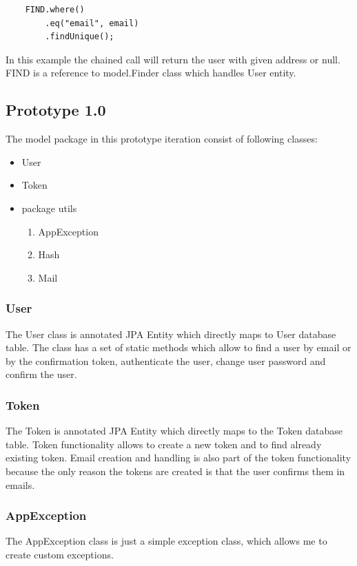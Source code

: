 \documentclass[12pt,twoside,a4paper]{report}
\begin{document}
\begin{lstlisting}
	FIND.where()
		.eq("email", email)
		.findUnique();
\end{lstlisting}

In this example the chained call will return the user with given address or null. FIND is a reference to model.Finder class which handles User entity.

\subsection{Prototype 1.0}\label{4.4.1}
The model package in this prototype iteration consist of following classes:
\begin{itemize}\itemsep1pt \parskip0pt 
	\item User
	\item Token
	\item package utils
	\begin{enumerate}
	\item AppException
	\item Hash
	\item Mail
	\end{enumerate}
\end{itemize}

\subsubsection{User}
The User class is annotated JPA Entity which directly maps to User database table. The class has a set of static methods which allow to find a user by email or by the confirmation token, authenticate the user, change user password and confirm the user.

\subsubsection{Token}
The Token is annotated JPA Entity which directly maps to the Token database table. Token functionality allows to create a new token and to find already existing token. Email creation and handling is also part of the token functionality because the only reason the tokens are created is that the user confirms them in emails.

\subsubsection{AppException}
The AppException class is just a simple exception class, which allows me to create custom exceptions.
\end{document}
